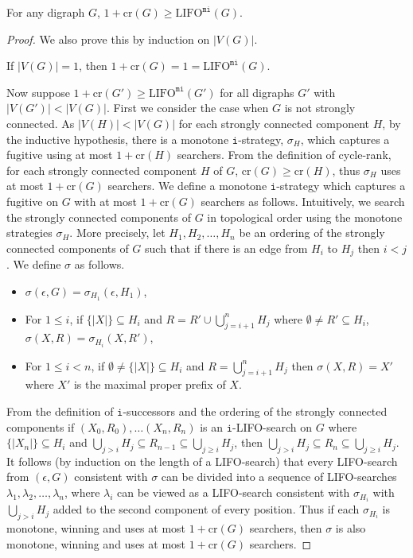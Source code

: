 \documentclass{llncs}
\newcommand{\letters}[1]{\{\!|#1|\!\}}
\newcommand{\cycr}[1]{\textrm{cr}(#1)}
\newcommand{\lifo}[1]{\textrm{LIFO}^{#1}}
\newcommand{\ivar}{\texttt{i}}
\newcommand{\mvar}{\texttt{m}}
\begin{document}
\begin{lemma}  
For any digraph $G$, $1+\cycr{G} \geq \lifo{\mvar\ivar}(G)$.
\end{lemma}
\begin{proof}
We also prove this by induction on $|V(G)|$.

If $|V(G)| = 1$, then $1 + \cycr{G} = 1 = \lifo{\mvar\ivar}(G)$.

Now suppose $1+\cycr{G'} \geq \lifo{\mvar\ivar}(G')$ for all digraphs $G'$ with $|V(G')| < |V(G)|$.
First we consider the case when $G$ is not strongly connected.  As $|V(H)| < |V(G)|$ for each strongly connected component $H$, by the inductive hypothesis,  there is a monotone $\ivar$-strategy, $\sigma_H$, which captures a fugitive using at most $1+\cycr{H}$ searchers.  From the definition of cycle-rank, for each strongly connected component $H$ of $G$, $\cycr{G} \geq \cycr{H}$, thus $\sigma_H$ uses at most $1+\cycr{G}$ searchers.  We define a monotone $\ivar$-strategy which captures a fugitive on $G$ with at most $1+\cycr{G}$ searchers as follows.  Intuitively, we search the strongly connected components of $G$ in topological order using the monotone strategies $\sigma_H$.  More precisely, let $H_1, H_2, \ldots, H_n$ be an ordering of the strongly connected components of $G$ such that if there is an edge from $H_i$ to $H_j$ then $i < j$.  We define $\sigma$ as follows.  
\begin{itemize}
	\item $\sigma(\epsilon, G) = \sigma_{H_1}(\epsilon, H_1)$,
	\item For $1 \leq i$, if $\letters{X} \subseteq H_i$ and $R = R' \cup \bigcup_{j=i+1}^n H_j$ where $\emptyset \neq R' \subseteq H_i$, $\sigma(X,R) = \sigma_{H_i}(X,R')$,
	\item For $1 \leq i < n$, if $\emptyset \neq \letters{X} \subseteq H_i$ and $R = \bigcup_{j=i+1}^n H_j$ then $\sigma(X,R) = X'$ where $X'$ is the maximal proper prefix of $X$.
\end{itemize}
From the definition of $\ivar$-successors and the ordering of the strongly connected components if $(X_0, R_0), \ldots (X_n, R_n)$ is an $\ivar$-LIFO-search on $G$ where $\letters{X_n} \subseteq H_i$ and $\bigcup_{j>i} H_j \subseteq R_{n-1}   \subseteq \bigcup_{j\geq i} H_j$, then $\bigcup_{j>i} H_j \subseteq R_{n}   \subseteq \bigcup_{j\geq i} H_j$.  
It follows (by induction on the length of a LIFO-search) that every LIFO-search from $(\epsilon, G)$ consistent with $\sigma$ can be divided into a sequence of LIFO-searches $\lambda_1, \lambda_2, \ldots, \lambda_n$, where $\lambda_i$ can be viewed as a LIFO-search consistent with $\sigma_{H_i}$ with $\bigcup_{j > i} H_j$ added to the second component of every position.
Thus if each $\sigma_{H_i}$ is monotone, winning and uses at most $1+\cycr{G}$ searchers, then $\sigma$ is also monotone, winning and uses at most $1+\cycr{G}$ searchers.


\end{proof}
\end{document}
